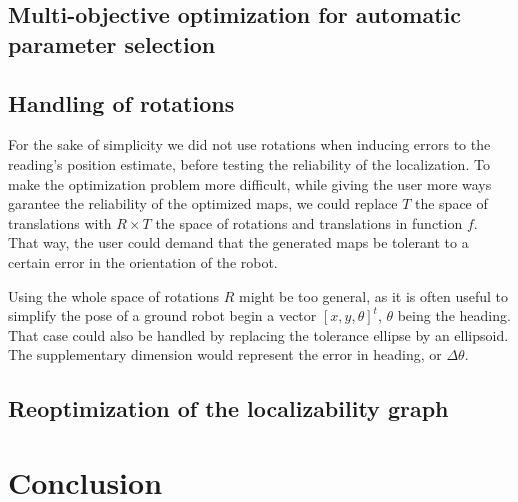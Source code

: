 \documentclass[letterpaper,10 pt,conference]{ieeeconf}
\begin{document}
\subsection{Multi-objective optimization for automatic parameter selection}

\subsection{Handling of rotations}

For the sake of simplicity we did not use rotations when inducing errors to the reading's
position estimate, before testing the reliability of the localization. To make the optimization
problem more difficult, while giving the user more ways garantee the reliability of the optimized
maps, we could replace $T$ the space of translations with $R \times T$ the space of rotations and
translations in function $f$. That way, the user could demand that the generated maps be tolerant to
a certain error in the orientation of the robot.

Using the whole space of rotations $R$ might be too general, as it is often useful to simplify the pose of a
ground robot begin a vector $[x, y, \theta]^t$, $\theta$ being the heading. That case could also be
handled by replacing the tolerance ellipse by an ellipsoid. The supplementary dimension would
represent the error in heading, or $\Delta \theta$.

\subsection{Reoptimization of the localizability graph}



\section{Conclusion}
\end{document}
